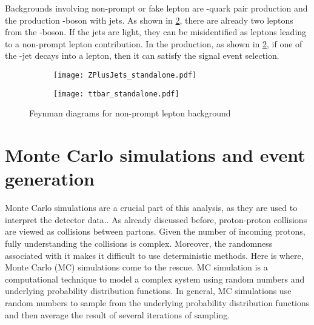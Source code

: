 Backgrounds involving non-prompt or fake lepton are \Ptop-quark pair production 
and the production \PZ-boson with jets. 
As shown in \cref{fig:fakefeynb}, there are already two leptons
from the \PZ-boson. If the jets are light, they can be misidentified as leptons leading to 
a non-prompt lepton contribution.
In the \Ptop{}\APtop production, as shown in \cref{fig:fakefeynb}, if one of the \Pbottom-jet decays 
into a lepton, then it can satisfy the signal event selection.


\begin{figure}[htbp]
  \centering
  \begin{subfigure}{0.45\figwidth}
    \centering
    \texttt{[image: ZPlusJets\_standalone.pdf]}
    \caption{}
    \label{fig:fakefeyna}
  \end{subfigure}
  \begin{subfigure}{0.45\figwidth}
    \centering
    \texttt{[image: ttbar\_standalone.pdf]}
    \caption{}
    \label{fig:fakefeynb}
  \end{subfigure}
  \caption[Feynman diagrams for non-prompt lepton backgrounds]{Feynman diagrams for non-prompt lepton background}
  \label{fig:fakefeyn}
  \end{figure}

\section{Monte Carlo simulations and event generation}
\label{sec:MCinfo}

Monte Carlo simulations are a crucial part of this analysis, as they are used to interpret the detector data.. 
As already discussed before, proton-proton collisions are viewed as collisions between partons.
Given the number of incoming protons, fully understanding the collisions is complex. Moreover,
the randomness associated with it makes it difficult to use deterministic methods. Here is where, 
Monte Carlo (MC) simulations come to the rescue. MC simulation is a computational technique
to model a complex system using random numbers and underlying probability distribution functions.
In general, MC simulations use random numbers to sample from the underlying probability distribution
functions and then average the result of several iterations of sampling.  

